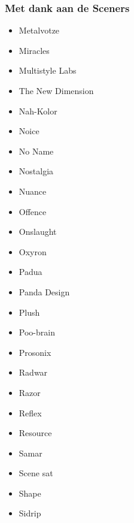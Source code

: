 \begin{frame}
\frametitle{Met dank aan de Sceners}

\begin{multicols}{3}
\begin{itemize}
\item Metalvotze
\item Miracles
\item Multistyle Labs
\item The New Dimension
\item Nah-Kolor
\item Noice
\item No Name
\item Nostalgia
\item Nuance
\item Offence
\item Onslaught
\item Oxyron
\item Padua
\item Panda Design
\item Plush
\item Poo-brain
\item Prosonix
\item Radwar
\item Razor
\item Reflex
\item Resource
\item Samar
\item Scene sat
\item Shape
\item Sidrip
\end{itemize}
\end{multicols}

\end{frame}


